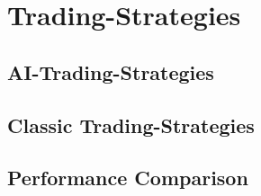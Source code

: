 \section{Trading-Strategies}

\subsection{AI-Trading-Strategies}

\subsection{Classic Trading-Strategies}

\subsection{Performance Comparison}